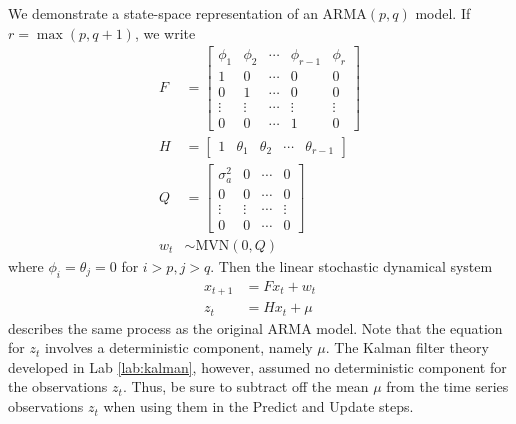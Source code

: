 We demonstrate a state-space representation of an $\text{ARMA}(p,q)$ model. If
$r = \max(p, q+1)$, we write
\begin{align}
    F &= \begin{bmatrix}
        \phi_1 & \phi_2 & \cdots & \phi_{r-1} & \phi_r\\
        1 & 0 & \cdots & 0 & 0\\
        0 & 1 & \cdots & 0 & 0\\
        \vdots & \vdots & \cdots & \vdots & \vdots\\
        0 & 0 & \cdots & 1 & 0
    \end{bmatrix}\\
    H &= \begin{bmatrix}
        1 & \theta_1 & \theta_2 & \cdots & \theta_{r-1}
    \end{bmatrix}\\
    Q &= \begin{bmatrix}
        \sigma_a^2 & 0 & \cdots & 0\\
        0 & 0 & \cdots & 0\\
        \vdots & \vdots & \cdots & \vdots\\
        0 & 0 & \cdots & 0
    \end{bmatrix}\\
    w_t &\sim \text{MVN}(0, Q)
\end{align}
where $\phi_i = \theta_j = 0$ for $i > p, j > q$. Then the linear stochastic
dynamical system
\begin{align}
    x_{t+1} &= Fx_t + w_t\\
    z_t &= Hx_t + \mu
\end{align}
describes the same process as the original $\text{ARMA}$ model.
Note that the equation for $z_t$ involves a deterministic component, namely $\mu$.
The Kalman filter theory developed in Lab \ref{lab:kalman}, however, assumed no
deterministic component for the observations $z_t$. Thus, be sure to subtract off the mean
$\mu$ from the time series observations $z_t$ when using them in the Predict and Update
steps.

